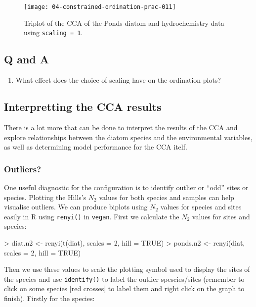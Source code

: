 \documentclass[a4paper,10pt]{article}
\newcommand{\R}{\textsf{R}\xspace}
\newcommand{\vegan}{\texttt{vegan}\xspace}
\begin{document}
\begin{figure}[t]
\begin{center}
\texttt{[image: 04-constrained-ordination-prac-011]}
\caption{\label{cca_triplot2}Triplot of the CCA of the Ponds diatom and hydrochemistry data using \texttt{scaling = 1}.}
\end{center}
\end{figure}

\subsection*{Q and A}
\begin{enumerate}
\item What effect does the choice of scaling have on the ordination plots?
\end{enumerate}

\subsection{Interpretting the CCA results}
There is a lot more that can be done to interpret the results of the CCA and explore relationships between the diatom species and the environmental variables, as well as determining model performance for the CCA itelf.

\subsubsection{Outliers?}
One useful diagnostic for the configuration is to identify outlier or ``odd'' sites or species. Plotting the Hills's $N_2$ values for both species and samples can help visualise outliers. We can produce biplots using $N_2$ values for species and sites easily in \R using \texttt{renyi()} in \vegan. First we calculate the $N_2$ values for sites and species:

\begin{Schunk}
\begin{Sinput}
> diat.n2 <- renyi(t(diat), scales = 2, hill = TRUE)
> ponds.n2 <- renyi(diat, scales = 2, hill = TRUE)
\end{Sinput}
\end{Schunk}
Then we use these values to scale the plotting symbol used to display the sites of the species and use \texttt{identify()} to label the outlier spescies/sites (remember to click on some species [red crosses] to label them and right click on the graph to finish). Firstly for the species:

\begin{Schunk}
\end{Schunk}
\end{document}
